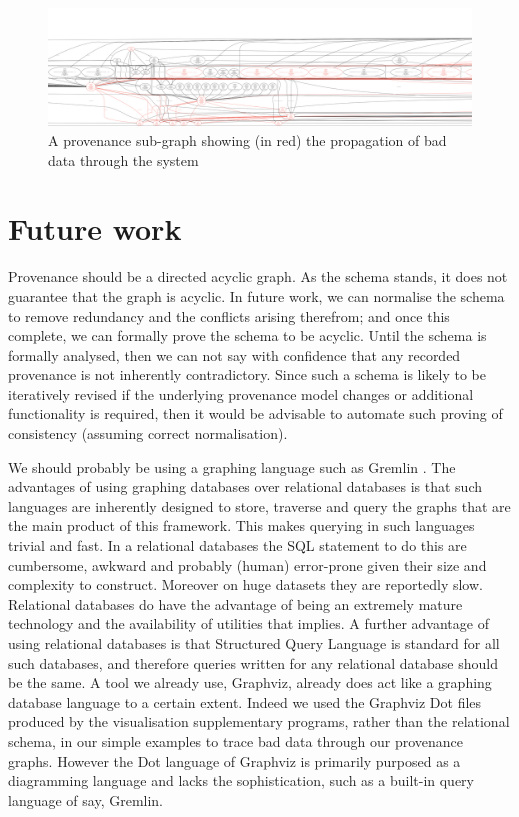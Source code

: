 \documentclass[runningheads]{llncs}
\begin{document}
\begin{figure} \includegraphics[width=\textwidth]{img/high-lit-provenance-trace.pdf}
\caption{A provenance sub-graph showing (in red) the propagation of bad data through the system} \label{fig:high-lit-provenance-trace} \end{figure}

\section{Future work}

Provenance should be a directed acyclic graph. As the schema stands, it does not
guarantee that the graph is acyclic. In future work, we can  normalise the
schema to remove redundancy and the conflicts arising therefrom;
and once this complete, we can formally prove the schema to be acyclic. 
Until the schema is formally analysed, then we can not say with confidence that
any recorded provenance is not inherently contradictory. Since such a schema is likely to be
iteratively revised if the underlying provenance model changes or additional
functionality is required, then it would be advisable to automate such proving
of consistency (assuming correct normalisation). 

We should probably be using a graphing language such as Gremlin \cite{rodriguez2015gremlin}. The
advantages of using graphing databases over relational databases is that such
languages are inherently designed to store, traverse and query the graphs that
are the main product of this framework. This makes querying in such languages
trivial and fast. In a relational databases the SQL statement to do this are
cumbersome, awkward and probably (human) error-prone given their size and complexity to construct. Moreover on huge
datasets they are reportedly slow. Relational databases do have the advantage
of being an extremely mature technology and the availability of utilities that
implies. A further advantage of using relational databases is that
Structured Query Language is standard for all such databases, and therefore
queries written for any relational database should be the same. A tool we
already use, Graphviz, already does act like a graphing database language to a
certain extent. Indeed we used the Graphviz Dot files produced by the visualisation supplementary programs, rather than the
relational schema, in our simple examples to trace bad data through our
provenance graphs.  However the Dot language of Graphviz is primarily
purposed as a diagramming language and lacks the sophistication, such as a
built-in query language of say, Gremlin.
\end{document}
